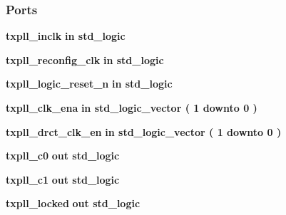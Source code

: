 \subsubsection*{Ports}
 \begin{DoxyCompactItemize}
\item 
{\bf txpll\+\_\+inclk}  {\bfseries {\bfseries \textcolor{keywordflow}{in}\textcolor{vhdlchar}{ }}} {\bfseries \textcolor{comment}{std\+\_\+logic}\textcolor{vhdlchar}{ }} 
\item 
{\bf txpll\+\_\+reconfig\+\_\+clk}  {\bfseries {\bfseries \textcolor{keywordflow}{in}\textcolor{vhdlchar}{ }}} {\bfseries \textcolor{comment}{std\+\_\+logic}\textcolor{vhdlchar}{ }} 
\item 
{\bf txpll\+\_\+logic\+\_\+reset\+\_\+n}  {\bfseries {\bfseries \textcolor{keywordflow}{in}\textcolor{vhdlchar}{ }}} {\bfseries \textcolor{comment}{std\+\_\+logic}\textcolor{vhdlchar}{ }} 
\item 
{\bf txpll\+\_\+clk\+\_\+ena}  {\bfseries {\bfseries \textcolor{keywordflow}{in}\textcolor{vhdlchar}{ }}} {\bfseries \textcolor{comment}{std\+\_\+logic\+\_\+vector}\textcolor{vhdlchar}{ }\textcolor{vhdlchar}{(}\textcolor{vhdlchar}{ }\textcolor{vhdlchar}{ } \textcolor{vhdldigit}{1} \textcolor{vhdlchar}{ }\textcolor{keywordflow}{downto}\textcolor{vhdlchar}{ }\textcolor{vhdlchar}{ } \textcolor{vhdldigit}{0} \textcolor{vhdlchar}{ }\textcolor{vhdlchar}{)}\textcolor{vhdlchar}{ }} 
\item 
{\bf txpll\+\_\+drct\+\_\+clk\+\_\+en}  {\bfseries {\bfseries \textcolor{keywordflow}{in}\textcolor{vhdlchar}{ }}} {\bfseries \textcolor{comment}{std\+\_\+logic\+\_\+vector}\textcolor{vhdlchar}{ }\textcolor{vhdlchar}{(}\textcolor{vhdlchar}{ }\textcolor{vhdlchar}{ } \textcolor{vhdldigit}{1} \textcolor{vhdlchar}{ }\textcolor{keywordflow}{downto}\textcolor{vhdlchar}{ }\textcolor{vhdlchar}{ } \textcolor{vhdldigit}{0} \textcolor{vhdlchar}{ }\textcolor{vhdlchar}{)}\textcolor{vhdlchar}{ }} 
\item 
{\bf txpll\+\_\+c0}  {\bfseries {\bfseries \textcolor{keywordflow}{out}\textcolor{vhdlchar}{ }}} {\bfseries \textcolor{comment}{std\+\_\+logic}\textcolor{vhdlchar}{ }} 
\item 
{\bf txpll\+\_\+c1}  {\bfseries {\bfseries \textcolor{keywordflow}{out}\textcolor{vhdlchar}{ }}} {\bfseries \textcolor{comment}{std\+\_\+logic}\textcolor{vhdlchar}{ }} 
\item 
{\bf txpll\+\_\+locked}  {\bfseries {\bfseries \textcolor{keywordflow}{out}\textcolor{vhdlchar}{ }}} {\bfseries \textcolor{comment}{std\+\_\+logic}\textcolor{vhdlchar}{ }} 

\end{DoxyCompactItemize}
